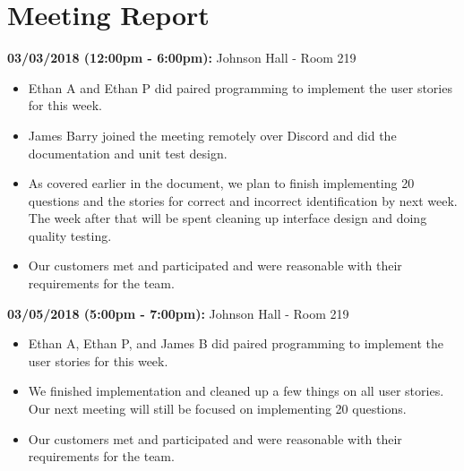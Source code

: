 \documentclass[a4paper]{article}
\begin{document}
\section{Meeting Report}
\textbf{03/03/2018 (12:00pm - 6:00pm):} Johnson Hall - Room 219
\begin{itemize}
\item Ethan A and Ethan P did paired programming to implement the user stories for this week.
\item James Barry joined the meeting remotely over Discord and did the documentation and unit test design.
\item As covered earlier in the document, we plan to finish implementing 20 questions and the stories for correct and incorrect identification by next week. The week after that will be spent cleaning up interface design and doing quality testing. 
\item Our customers met and participated and were reasonable with their requirements for the team.
\end{itemize}
\textbf{03/05/2018 (5:00pm - 7:00pm):} Johnson Hall - Room 219
\begin{itemize}
\item Ethan A, Ethan P, and James B did paired programming to implement the user stories for this week.
\item We finished implementation and cleaned up a few things on all user stories. Our next meeting will still be focused on implementing 20 questions. 
\item Our customers met and participated and were reasonable with their requirements for the team.
\end{itemize}
\end{document}
